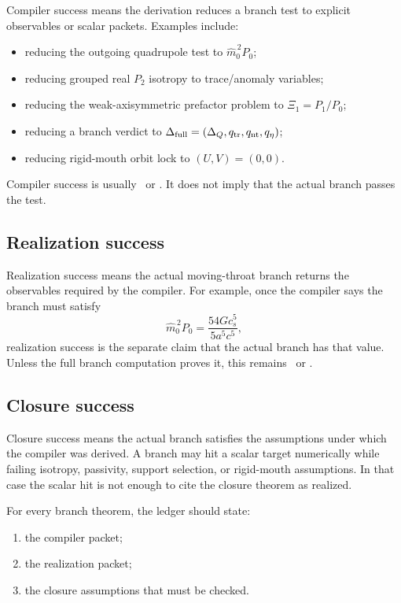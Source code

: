 Compiler success means the derivation reduces a branch test to explicit observables or scalar packets.  Examples include:
\begin{itemize}[leftmargin=2.2em]
  \item reducing the outgoing quadrupole test to \(\widehat m_0^{\,2}P_0\);
  \item reducing grouped real \(P_2\) isotropy to trace/anomaly variables;
  \item reducing the weak-axisymmetric prefactor problem to \(\Xi_1=P_1/P_0\);
  \item reducing a branch verdict to \(\Delta_{\rm full}=(\Delta_Q,q_{\rm tr},q_{\rm nt},q_\eta)\);
  \item reducing rigid-mouth orbit lock to \((U,V)=(0,0)\).
\end{itemize}
Compiler success is usually \StatusExactClosure\ or \StatusReduced.  It does not imply that the actual branch passes the test.

\subsection{Realization success}

Realization success means the actual moving-throat branch returns the observables required by the compiler.  For example, once the compiler says the branch must satisfy
\[
\widehat m_0^{\,2}P_0=\frac{54Gc_s^5}{5a^5c^5},
\]
realization success is the separate claim that the actual branch has that value.  Unless the full branch computation proves it, this remains \StatusOpen\ or \StatusNumerical.

\subsection{Closure success}

Closure success means the actual branch satisfies the assumptions under which the compiler was derived.  A branch may hit a scalar target numerically while failing isotropy, passivity, support selection, or rigid-mouth assumptions.  In that case the scalar hit is not enough to cite the closure theorem as realized.

For every branch theorem, the ledger should state:
\begin{enumerate}[leftmargin=2.2em]
  \item the compiler packet;
  \item the realization packet;
  \item the closure assumptions that must be checked.
\end{enumerate}

